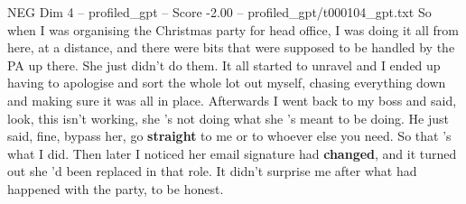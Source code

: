 \begin{textsample}{NEG Dim 4 – profiled\_gpt – Score -2.00 – profiled\_gpt/t000104\_gpt.txt}  \label{ex:f4_neg_013}
So when I was organising the Christmas party for head office, I was doing it all from here, at a distance, and there were bits that were supposed to be handled by the PA up there.
She just didn't do them.
It all started to unravel and I ended up having to apologise and sort the whole lot out myself, chasing everything down and making sure it was all in place.
Afterwards I went back to my boss and said, look, this isn't working, she ’s not doing what she ’s meant to be doing.
He just said, fine, bypass her, go \textbf{straight} to me or to whoever else you need.
So that ’s what I did.
Then later I noticed her email signature had \textbf{changed}, and it turned out she ’d been replaced in that role.
It didn't surprise me after what had happened with the party, to be honest.

\end{textsample}
